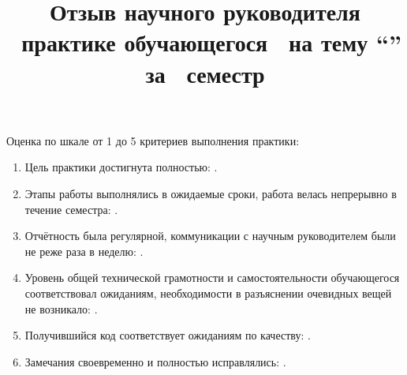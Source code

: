 \documentclass[a4paper]{article}
\title{Отзыв научного руководителя \practiceType\ практике обучающегося\newline
\studentName\ на тему \enquote{\practiceTitle} за \practiceSemester\ семестр}
\author{}
\date{}
\begin{document}
\maketitle

Оценка по шкале от 1 до 5 критериев выполнения практики:

\begin{enumerate}
    \item Цель практики достигнута полностью: \newline
        \textbf{\completenessGrade}.
    \item Этапы работы выполнялись в ожидаемые сроки, работа велась непрерывно в течение семестра: \newline
        \textbf{\continuityGrade}.
    \item Отчётность была регулярной, коммуникации с научным руководителем были не реже раза в неделю: \newline
        \textbf{\communicationsGrade}.
    \item Уровень общей технической грамотности и самостоятельности обучающегося соответствовал ожиданиям, необходимости в разъяснении очевидных вещей не возникало: \newline
        \textbf{\competenceGrade}.
    \item Получившийся код соответствует ожиданиям по качеству: \newline
        \textbf{\codeGrade}.
    \item Замечания своевременно и полностью исправлялись: \newline
        \textbf{\fixesGrade}.
\end{enumerate}
\end{document}
